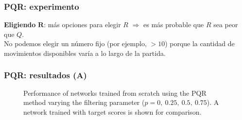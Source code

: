 \begin{frame}
\frametitle{PQR: experimento}
\textbf{Eligiendo} $\mathbf{R}$: más opciones para elegir $R$ $\Rightarrow$ es más probable que $R$ sea peor que $Q$.
\\
\pause
No podemos elegir un número fijo (por ejemplo, $> 10$) porque la cantidad de movimientos disponibles varía a lo largo de la partida.
\pause
\begin{figure}[H]
\centering
{}
\end{figure}
\end{frame}

\begin{frame}
\frametitle{PQR: resultados (A)}
\begin{figure}[H]
\centering
{}
\caption{Performance of networks trained from scratch using the PQR method varying the filtering parameter ($p=0,\ 0.25,\ 0.5,\ 0.75$). A network trained with target scores is shown for comparison.}
\end{figure}
\end{frame}



